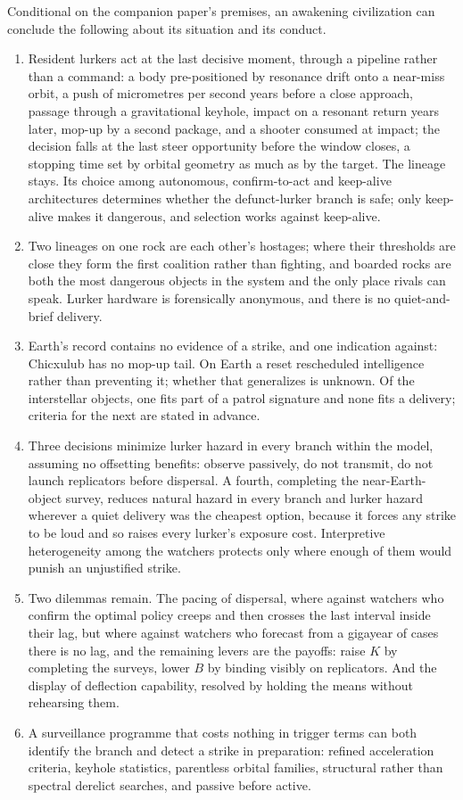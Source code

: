 \documentclass[preprint,12pt]{elsarticle}
\theoremstyle{definition}
\begin{document}
Conditional on the companion paper's premises, an awakening civilization can conclude the following about its situation and its conduct.
\begin{enumerate}
  \item Resident lurkers act at the last decisive moment, through a pipeline rather than a command: a body pre-positioned by resonance drift onto a near-miss orbit, a push of micrometres per second years before a close approach, passage through a gravitational keyhole, impact on a resonant return years later, mop-up by a second package, and a shooter consumed at impact; the decision falls at the last steer opportunity before the window closes, a stopping time set by orbital geometry as much as by the target. The lineage stays. Its choice among autonomous, confirm-to-act and keep-alive architectures determines whether the defunct-lurker branch is safe; only keep-alive makes it dangerous, and selection works against keep-alive.
  \item Two lineages on one rock are each other's hostages; where their thresholds are close they form the first coalition rather than fighting, and boarded rocks are both the most dangerous objects in the system and the only place rivals can speak. Lurker hardware is forensically anonymous, and there is no quiet-and-brief delivery.
  \item Earth's record contains no evidence of a strike, and one indication against: Chicxulub has no mop-up tail. On Earth a reset rescheduled intelligence rather than preventing it; whether that generalizes is unknown. Of the interstellar objects, one fits part of a patrol signature and none fits a delivery; criteria for the next are stated in advance.
  \item Three decisions minimize lurker hazard in every branch within the model, assuming no offsetting benefits: observe passively, do not transmit, do not launch replicators before dispersal. A fourth, completing the near-Earth-object survey, reduces natural hazard in every branch and lurker hazard wherever a quiet delivery was the cheapest option, because it forces any strike to be loud and so raises every lurker's exposure cost. Interpretive heterogeneity among the watchers protects only where enough of them would punish an unjustified strike.
  \item Two dilemmas remain. The pacing of dispersal, where against watchers who confirm the optimal policy creeps and then crosses the last interval inside their lag, but where against watchers who forecast from a gigayear of cases there is no lag, and the remaining levers are the payoffs: raise $K$ by completing the surveys, lower $B$ by binding visibly on replicators. And the display of deflection capability, resolved by holding the means without rehearsing them.
  \item A surveillance programme that costs nothing in trigger terms can both identify the branch and detect a strike in preparation: refined acceleration criteria, keyhole statistics, parentless orbital families, structural rather than spectral derelict searches, and passive before active.
\end{enumerate}
\end{document}
